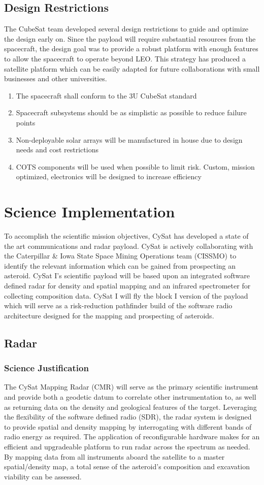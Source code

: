 \documentclass[nocover]            %
{CSLI}                       %
\begin{document}
\subsection{Design Restrictions}
The CubeSat team developed several design restrictions to guide and optimize the design early on. Since the payload will require substantial resources from the spacecraft, the design goal was to provide a robust platform with enough features to allow the spacecraft to operate beyond LEO. This strategy has produced a satellite platform which can be easily adapted for future collaborations with small businesses and other universities. 
\begin{enumerate}
\item The spacecraft shall conform to the 3U CubeSat standard
\item Spacecraft subsystems should be as simplistic as possible to reduce failure points 
\item Non-deployable solar arrays will be manufactured in house due to design needs and cost restrictions
\item COTS components will be used when possible to limit risk. Custom, mission optimized, electronics will be designed to increase efficiency
\end{enumerate}

\section{Science Implementation}
To accomplish the scientific mission objectives, CySat has developed a state of the art communications and radar payload. CySat is actively collaborating with the Caterpillar \& Iowa State Space Mining Operations team (CISSMO) to identify the relevant information which can be gained from prospecting an asteroid. CySat I's scientific payload will be based upon an integrated software defined radar for density and spatial mapping and an infrared spectrometer for collecting composition data. CySat I will fly the block I version of the payload which will serve as a risk-reduction pathfinder build of the software radio architecture designed for the mapping and prospecting of asteroids.
\subsection{Radar}
\subsubsection{Science Justification}
The CySat Mapping Radar (CMR) will serve as the primary scientific instrument and provide both a geodetic datum to correlate other instrumentation to, as well as returning data on the density and geological features of the target. Leveraging the flexibility of the software defined radio (SDR), the radar system is designed to provide spatial and density mapping by interrogating with different bands of radio energy as required. The application of reconfigurable hardware makes for an efficient and upgradeable platform to run radar across the spectrum as needed. By mapping data from all instruments aboard the satellite to a master spatial/density map, a total sense of the asteroid's composition and excavation viability can be assessed.
\end{document}
